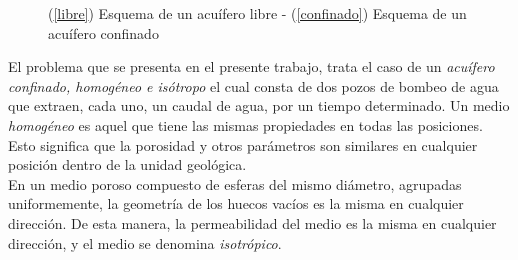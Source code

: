 \documentclass[10pt,a4paper,final]{article}
\begin{document}
\begin{figure}[tbhp]
   \centering
   \hspace{0.1\linewidth}
    \caption{(\ref{libre}) Esquema de un acuífero libre - (\ref{confinado}) Esquema de un acuífero confinado}
   \label{acuiferos}                %
\end{figure}
%
%
El problema que se presenta en el presente trabajo, trata el caso de un \emph{acuífero confinado, homogéneo e isótropo} el cual consta de dos pozos de bombeo de agua que extraen, cada uno, un caudal de agua, por un tiempo determinado.
Un medio \emph{homogéneo} es aquel que tiene las mismas propiedades en todas las posiciones. Esto significa que la porosidad y otros parámetros son similares en cualquier posición dentro de la unidad geológica.\\
En un medio poroso compuesto de esferas del mismo diámetro, agrupadas uniformemente, la geometría de los huecos vacíos es la misma en cualquier dirección. De esta manera, la permeabilidad del medio es la misma en cualquier dirección, y el medio se denomina \emph{isotrópico}.
\end{document}
